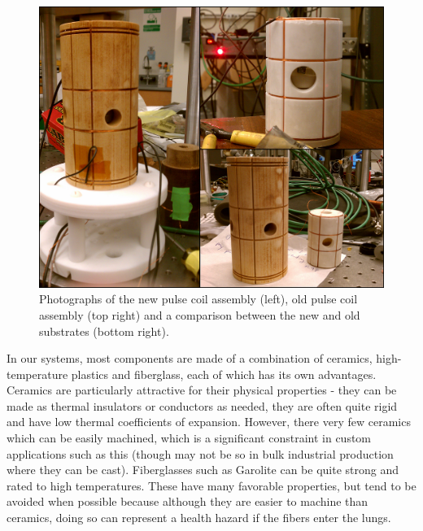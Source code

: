 \documentclass[PaulGanssle-Thesis.tex]{subfiles}
\begin{document}
\begin{figure}[p]
\centering
\includegraphics[width=\tw]{figures/magnetometer/PulseCoilsCollageSmaller.png}
\caption{Photographs of the new pulse coil assembly (left), old pulse coil assembly (top right) and a comparison between the new and old substrates (bottom right).}
\label{fig:PulseCoilPhotos}
\end{figure}

In our systems, most components are made of a combination of ceramics, high-temperature plastics and fiberglass, each of which has its own advantages. Ceramics are particularly attractive for their physical properties - they can be made as thermal insulators or conductors as needed, they are often quite rigid and have low thermal coefficients of expansion. However, there very few ceramics which can be easily machined, which is a significant constraint in custom applications such as this (though may not be so in bulk industrial production where they can be cast). Fiberglasses such as Garolite can be quite strong and rated to high temperatures. These have many favorable properties, but tend to be avoided when possible because although they are easier to machine than ceramics, doing so can represent a health hazard if the fibers enter the lungs. 
\end{document}
